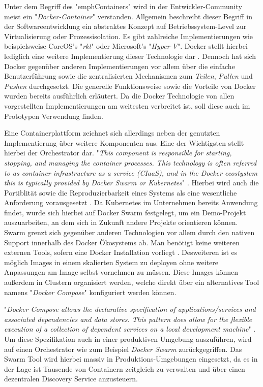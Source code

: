 Unter dem Begriff des "emph{Containers}" wird in der Entwickler-Community meist ein "\emph{Docker-Container}" verstanden. Allgemein beschreibt dieser Begriff in der Softwareentwicklung ein abstraktes Konzept auf Betriebssystem-Level zur Virtualisierung oder Prozessisolation. Es gibt zahlreiche Implementierungen wie beispielsweise CoreOS's "\emph{rkt}" oder Microsoft's "\emph{Hyper-V}". Docker stellt hierbei lediglich eine weitere Implementierung dieser Technologie dar \cite[Seite~63 ff.]{continuous-delivery}. Dennoch hat sich Docker gegenüber anderen Implementierungen vor allem über die einfache Benutzerführung sowie die zentralisierten Mechanismen zum \emph{Teilen}, \emph{Pullen} und \emph{Pushen} durchgesetzt. Die generelle Funktionsweise sowie die Vorteile von Docker wurden bereits ausführlich erläutert. Da die Docker Technologie von allen vorgestellten Implementierungen am weitesten verbreitet ist, soll diese auch im Prototypen Verwendung finden. 

Eine Containerplattform zeichnet sich allerdings neben der genutzten Implementierung über weitere Komponenten aus. Eine der Wichtigsten stellt hierbei der Orchestrator dar. "\emph{This component is responsible for starting, stopping, and managing the container processes. This technology is often referred to as container infrastructure as a service (CIaaS), and in the Docker ecostystem this is typically provided by Docker Swarm or Kubernetes}" \cite[Seite~64 ff.]{continuous-delivery}. Hierbei wird auch die Portiblität sowie die Reproduzierbarkeit eines Systems als eine wesentliche Anforderung vorausgesetzt \cite[Kapitel Orchestration]{docker-doc}. Da Kubernetes im Unternehmen bereits Anwendung findet, wurde sich hierbei auf Docker Swarm festgelegt, um ein Demo-Projekt auszuarbeiten, an dem sich in Zukunft andere Projekte orientieren können. Swarm grenzt sich gegenüber anderen Technologien vor allem durch den nativen Support innerhalb des Docker Ökosystems ab. Man benötigt keine weiteren externen Tools, sofern eine Docker Installation vorliegt \cite[Seite~10 ff.]{soppelsaswarm}. Desweiteren ist es möglich Images in einem skalierten System zu deployen ohne weitere Anpassungen am Image selbst vornehmen zu müssen. Diese Images können außerdem in Clustern organisiert werden, welche direkt über ein alternatives Tool namens "\emph{Docker Compose}" konfiguriert werden können.

"\emph{Docker Compose allows the declarative specification of applications/services and associated dependencies and data stores. This pattern does allow for the flexible execution of a collection of dependent services on a local development machine}" \cite[Seite~173]{continuous-delivery}. Um diese Spezifikation auch in einer produktiven Umgebung auszuführen, wird auf einen Orchestrator wie zum Beispiel \emph{Docker Swarm} zurückgegriffen. Das Swarm Tool wird hierbei massiv in Produktions-Umgebungen eingesetzt, da es in der Lage ist Tausende von Containern zeitgleich zu verwalten und über einen dezentralen Discovery Service anzusteuern. 

